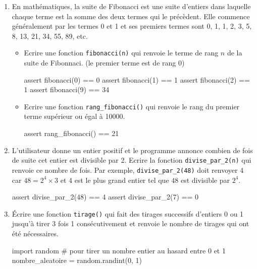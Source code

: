 \begin{exercice_cours}{}
\begin{enumerate}
				 \item En mathématiques, la suite de Fibonacci est une suite d'entiers dans laquelle chaque terme est la somme des deux termes qui le précèdent. Elle commence généralement par les termes 0 et 1 et ses premiers termes sont 0, 1, 1, 2, 3, 5, 8, 13, 21, 34, 55, 89, etc.
			
			\begin{itemize}
				\item Ecrire une fonction \verb|fibonacci(n)| qui renvoie le terme de rang $n$ de la suite de Fibonnaci. (le premier terme est de rang 0)
				\begin{CodePythontexAlt}[Largeur=1\linewidth,Centre,PremLigne=1, Lignes=false,]{}
					assert fibonacci(0) == 0
					assert fibonacci(1) == 1
					assert fibonacci(2) == 1
					assert fibonacci(9) == 34
					\end{CodePythontexAlt}
				\item 			Ecrire une fonction \verb|rang_fibonacci()| qui renvoie le rang du premier terme supérieur ou égal à 10000.
				
			\begin{CodePythontexAlt}[Largeur=1\linewidth,Centre,PremLigne=1, Lignes=false,]{}
					assert rang_fibonacci() == 21
					\end{CodePythontexAlt}
			\end{itemize}

\medskip

			\item L'utilisateur donne un entier positif et le programme annonce combien de fois de suite cet entier est divisible par 2. Ecrire la fonction \verb|divise_par_2(n)| qui renvoie ce nombre de fois. Par exemple, \verb|divise_par_2(48)| doit renvoyer 4 car $48=2^4\times3$ et 4 est le plus grand entier tel que $48$ est divisible par $2^4$.
			
			\begin{CodePythontexAlt}[Largeur=1\linewidth,Centre,PremLigne=1, Lignes=false,]{}
assert divise_par_2(48) == 4
assert divise_par_2(7) == 0
\end{CodePythontexAlt}

\medskip

	\item Écrire une fonction \verb|tirage()| qui fait des tirages successifs  d'entiers 0 ou 1 jusqu'à tirer 3 fois 1 consécutivement et
			renvoie le nombre de tirages qui ont été nécessaires.

			\begin{methode}[La bibliothèque \texttt{random}]{}
					\begin{CodePythontexAlt}[Largeur=1\linewidth,Centre,PremLigne=1, Lignes=false,]{}
					import random
					# pour tirer un nombre entier au hasard entre 0 et 1
					nombre_aleatoire = random.randint(0, 1)	
					\end{CodePythontexAlt}
				\end{methode}


\end{enumerate}
\end{exercice_cours}
